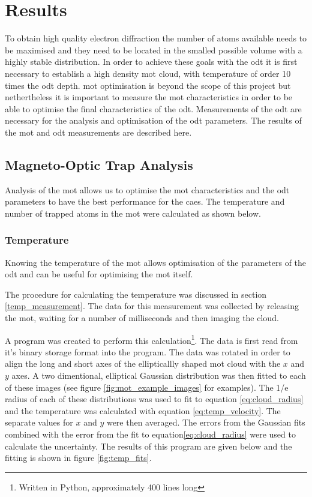 \chapter{Results}

To obtain high quality electron diffraction the number of atoms available needs to be maximised and they need to be located in the smalled possible volume with a highly stable distribution. In order to achieve these goals with the \gls{odt} it is first necessary to establish a high density \gls{mot} cloud, with temperature of order 10 times the \gls{odt} depth. \Gls{mot} optimisation is beyond the scope of this project but nethertheless it is important to measure the \gls{mot} characteristics in order to be able to optimise the final characteristics of the \gls{odt}. Measurements of the \gls{odt} are necessary for the analysis and optimisation of the \gls{odt} parameters. The results of the \gls{mot} and \gls{odt} measurements are described here.

\section{Magneto-Optic Trap Analysis}
Analysis of the \gls{mot} allows us to optimise the \gls{mot} characteristics and the \gls{odt} parameters to have the best performance for the \gls{caes}. The temperature and number of trapped atoms in the \gls{mot} were calculated as shown below.

\subsection{Temperature}
Knowing the temperature of the \gls{mot} allows optimisation of the parameters of the \gls{odt} and can be useful for optimising the \gls{mot} itself.

The procedure for calculating the temperature was discussed in section \ref{temp_measurement}. The data for this measurement was collected by releasing the \gls{mot}, waiting for a number of milliseconds and then imaging the cloud.

A program was created to perform this calculation\footnote{Written in Python, approximately 400 lines long}. The data is first read from it's binary storage format into the program. The data was rotated in order to align the long and short axes of the ellipticallly shaped \gls{mot} cloud with the $x$ and $y$ axes. A two dimentional, elliptical Gaussian distribution was then fitted to each of these images (see figure \ref{fig:mot_example_images} for examples). The 1/e radius of each of these distributions was used to fit to equation \ref{eq:cloud_radius} and the temperature was calculated with equation \ref{eq:temp_velocity}. The separate values for $x$ and $y$ were then averaged. The errors from the Gaussian fits combined with the error from the fit to equation\ref{eq:cloud_radius} were used to calculate the uncertainty. The results of this program are given below and the fitting is shown in figure \ref{fig:temp_fits}.

